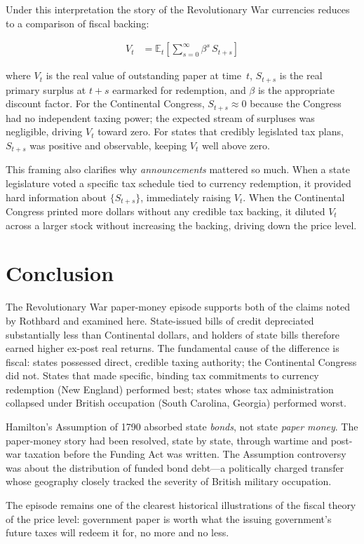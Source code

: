 \documentclass[12pt]{article}
\begin{document}
Under this interpretation the story of the Revolutionary War currencies
reduces to a comparison of fiscal backing:

\begin{align*}
  V_t &= \mathbb{E}_t \left[ \sum_{s=0}^{\infty} \beta^s \, S_{t+s} \right]
\end{align*}

where $V_t$ is the real value of outstanding paper at time~$t$, $S_{t+s}$
is the real primary surplus at $t+s$ earmarked for redemption, and $\beta$
is the appropriate discount factor.  For the Continental Congress,
$S_{t+s} \approx 0$ because the Congress had no independent taxing power;
the expected stream of surpluses was negligible, driving $V_t$ toward zero.
For states that credibly legislated tax plans, $S_{t+s}$ was positive and
observable, keeping $V_t$ well above zero.

This framing also clarifies why \emph{announcements} mattered so much.
When a state legislature voted a specific tax schedule tied to currency
redemption, it provided hard information about $\{S_{t+s}\}$, immediately
raising $V_t$.  When the Continental Congress printed more dollars without
any credible tax backing, it diluted $V_t$ across a larger stock without
increasing the backing, driving down the price level.

\section{Conclusion}

The Revolutionary War paper-money episode supports both of the claims
noted by Rothbard and examined here.  State-issued bills of credit
depreciated substantially less than Continental dollars, and holders of
state bills therefore earned higher ex-post real returns.  The fundamental
cause of the difference is fiscal: states possessed direct, credible taxing
authority; the Continental Congress did not.  States that made specific,
binding tax commitments to currency redemption (New England) performed best;
states whose tax administration collapsed under British occupation (South
Carolina, Georgia) performed worst.

Hamilton's Assumption of 1790 absorbed state \emph{bonds}, not state
\emph{paper money}.  The paper-money story had been resolved, state by
state, through wartime and post-war taxation before the Funding Act was
written.  The Assumption controversy was about the distribution of funded
bond debt---a politically charged transfer whose geography closely tracked
the severity of British military occupation.

The episode remains one of the clearest historical illustrations of the
fiscal theory of the price level: government paper is worth what the
issuing government's future taxes will redeem it for, no more and no less.



\end{document}
